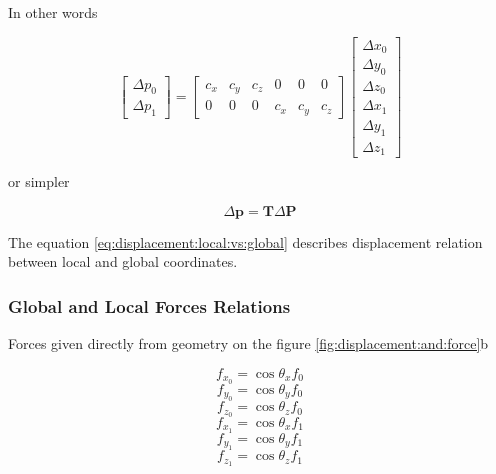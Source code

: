 In other words

\begin{equation}
\begin{bmatrix}
	\Delta p_0 \\
	\Delta p_1
\end{bmatrix}
=
\begin{bmatrix}
	c_x & c_y & c_z & 0 & 0 & 0 \\
	0 & 0 & 0 & c_x & c_y & c_z
\end{bmatrix}
\begin{bmatrix}
	\Delta x_0 \\
	\Delta y_0 \\
	\Delta z_0 \\
	\Delta x_1 \\
	\Delta y_1 \\
	\Delta z_1
\end{bmatrix}
\end{equation}

or simpler

\begin{equation}
\Delta \mathbf{p} = \mathbf{T} \Delta \mathbf{P}
\label{eq:displacement:local:vs:global}
\end{equation}

The equation \ref{eq:displacement:local:vs:global} describes displacement relation between local and global coordinates.

\subsubsection{Global and Local Forces Relations}

Forces given directly from geometry on the figure \ref{fig:displacement:and:force}b

\begin{equation}
f_{x_0} = \cos \theta_x f_0
\end{equation}
\begin{equation}
f_{y_0} = \cos \theta_y f_0
\end{equation}
\begin{equation}
f_{z_0} = \cos \theta_z f_0
\end{equation}
\begin{equation}
f_{x_1} = \cos \theta_x f_1
\end{equation}
\begin{equation}
f_{y_1} = \cos \theta_y f_1
\end{equation}
\begin{equation}
f_{z_1} = \cos \theta_z f_1
\end{equation}

